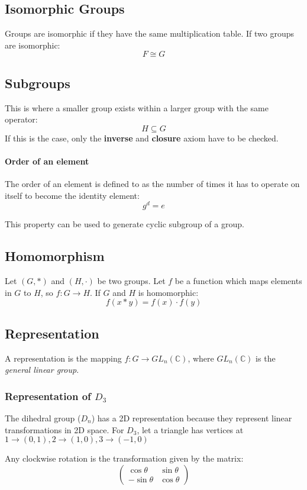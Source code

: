 \documentclass[12pt]{article}
\begin{document}
\subsection{Isomorphic Groups}
Groups are isomorphic if they have the same multiplication table. If two groups are isomorphic:
\[ F \cong G\]



\subsection{Subgroups}
This is where a smaller group exists within a larger group with the same operator:
\[ H \subseteq G\]
If this is the case, only the \textbf{inverse} and \textbf{closure} axiom have to be checked.

\paragraph{Order of an element}
The order of an element is defined to as the number of times it has to operate on itself to become the identity element:
\[ g^d = e\]

This property can be used to generate cyclic subgroup of a group.

\subsection{Homomorphism}

Let $(G,*)$ and $(H,\cdot)$ be two groups. Let $f$ be a function which maps elements in $G$ to $H$, so $f: G\to H$. If $G$ and $H$ is homomorphic:
\[ f(x*y) = f(x) \cdot f(y)\]

\subsection{Representation}
A representation is the mapping $f: G \to GL_n(\mathbb{C})$, where $GL_n(\mathbb{C})$ is the \textit{general linear group}.

\subsubsection{Representation of $D_3$}
The dihedral group ($D_n$) has a 2D representation because they represent linear transformations in 2D space. For $D_3$, let a triangle has vertices at $1\to (0,1), 2\to(1,0), 3\to(-1,0)$

Any clockwise rotation is the transformation given by the matrix:
\[
\begin{pmatrix}
\cos\theta & \sin\theta\\
-\sin\theta & \cos\theta
\end{pmatrix}
\]
\end{document}
